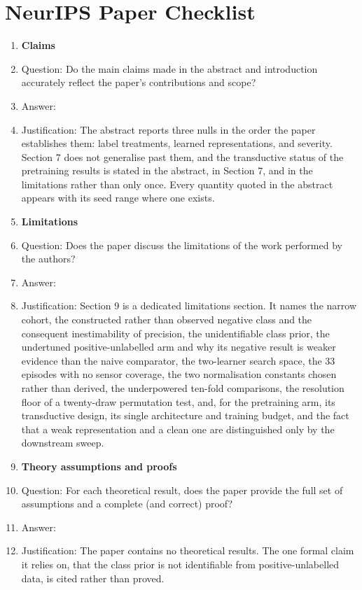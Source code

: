 \section*{NeurIPS Paper Checklist}

\begin{enumerate}

\item {\bf Claims}
    \item[] Question: Do the main claims made in the abstract and introduction accurately reflect the paper's contributions and scope?
    \item[] Answer: \answerYes{}
    \item[] Justification: The abstract reports three nulls in the order the paper establishes them: label treatments, learned representations, and severity. Section 7 does not generalise past them, and the transductive status of the pretraining results is stated in the abstract, in Section 7, and in the limitations rather than only once. Every quantity quoted in the abstract appears with its seed range where one exists.

\item {\bf Limitations}
    \item[] Question: Does the paper discuss the limitations of the work performed by the authors?
    \item[] Answer: \answerYes{}
    \item[] Justification: Section 9 is a dedicated limitations section. It names the narrow cohort, the constructed rather than observed negative class and the consequent inestimability of precision, the unidentifiable class prior, the undertuned positive-unlabelled arm and why its negative result is weaker evidence than the naive comparator, the two-learner search space, the 33 episodes with no sensor coverage, the two normalisation constants chosen rather than derived, the underpowered ten-fold comparisons, the resolution floor of a twenty-draw permutation test, and, for the pretraining arm, its transductive design, its single architecture and training budget, and the fact that a weak representation and a clean one are distinguished only by the downstream sweep.

\item {\bf Theory assumptions and proofs}
    \item[] Question: For each theoretical result, does the paper provide the full set of assumptions and a complete (and correct) proof?
    \item[] Answer: \answerNA{}
    \item[] Justification: The paper contains no theoretical results. The one formal claim it relies on, that the class prior is not identifiable from positive-unlabelled data, is cited rather than proved.


\end{enumerate}
